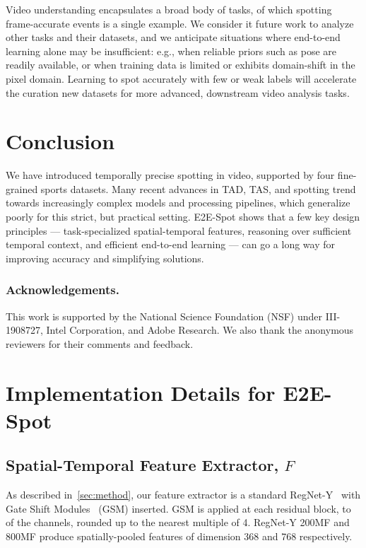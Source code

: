 \documentclass[runningheads]{llncs}
\newcommand{\notation}[1]{\ensuremath{#1}\xspace}
\newcommand{\OURMETHOD}{{E2E-Spot}\xspace}
\newcommand{\FeatureExtractor}{\notation{F}}
\begin{document}
Video understanding encapsulates a broad body of tasks, of which spotting frame-accurate events is a single example.
We consider it future work to analyze other tasks and their datasets, and we  anticipate situations where end-to-end learning alone may be insufficient:
e.g., when reliable priors such as pose are readily available, or when training data is limited or exhibits domain-shift in the pixel domain.
Learning to spot accurately with few or weak labels will accelerate the curation new datasets for more advanced, downstream video analysis tasks.
 
\section{Conclusion}

We have introduced temporally precise spotting in video, supported by four fine-grained sports datasets.
Many recent advances in TAD, TAS, and spotting trend towards increasingly complex models and processing pipelines, which generalize poorly for this strict, but practical setting.
\OURMETHOD shows that a few key design principles --- task-specialized
spatial-temporal features, reasoning over sufficient temporal context, and efficient end-to-end learning --- can go a long way for improving accuracy and simplifying solutions.

 
\subsubsection*{Acknowledgements.}
This work is supported by the National Science Foundation (NSF) under III-1908727, Intel Corporation, and Adobe Research.
We also thank the anonymous reviewers for their comments and feedback. 
\appendix

\section{Implementation Details for \OURMETHOD}
\label{sec:supp_our_impl}

\subsection{Spatial-Temporal Feature Extractor, \FeatureExtractor}

As described in~\autoref{sec:method}, our feature extractor is a standard RegNet-Y~\cite{regnet} with Gate Shift Modules~\cite{gsm} (GSM) inserted.
GSM is applied at each residual block, to  of the channels, rounded up to the nearest multiple of 4.
RegNet-Y 200MF and 800MF produce spatially-pooled features of dimension 368 and 768 respectively.
\end{document}
